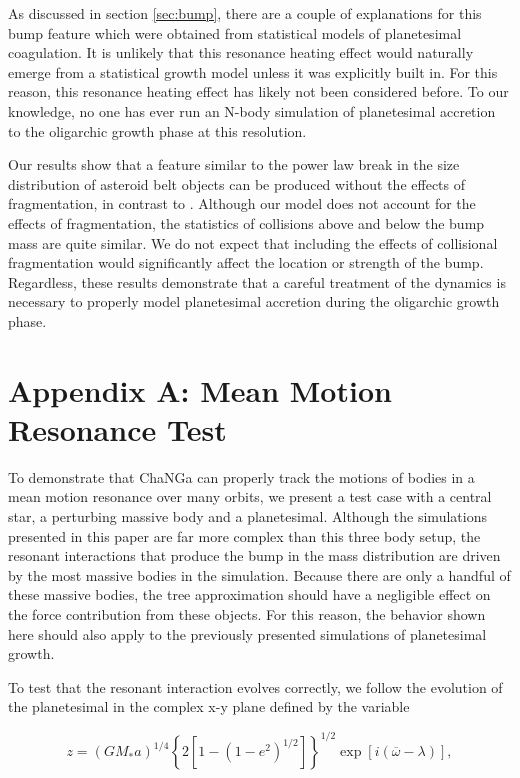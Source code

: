 As discussed in section \ref{sec:bump}, there are a couple of explanations for this bump feature which were obtained from 
statistical models of planetesimal coagulation. It is unlikely that this resonance heating effect would naturally emerge from a 
statistical growth model unless it was explicitly built in. For this reason, this resonance heating effect has likely not been 
considered before. To our knowledge, no one has ever run an N-body simulation of planetesimal accretion to the oligarchic 
growth phase at this resolution.

Our results show that a feature similar to the power law break in the size distribution of asteroid belt objects can be produced 
without the effects of fragmentation, in contrast to \cite{morbidelli09}. Although our model does not account for the effects of 
fragmentation, the statistics of collisions above and below the bump mass are quite similar. We do not expect that including the 
effects of collisional fragmentation would significantly affect the location or strength of the bump. Regardless, these results 
demonstrate that a careful treatment of the dynamics is necessary to properly model planetesimal accretion during the oligarchic 
growth phase.


\section{Appendix A: Mean Motion Resonance Test}

To demonstrate that {\sc ChaNGa} can properly track the motions of bodies in a mean motion resonance over many orbits, we 
present a test case with a central star, a perturbing massive body and a planetesimal. Although the simulations presented in this 
paper are far more complex than this three body setup, the resonant interactions that produce the bump in the mass distribution 
are driven by the most massive bodies in the simulation. Because there are only a handful of these massive bodies, the tree 
approximation should have a negligible effect on the force contribution from these objects. For this reason, the behavior shown 
here should also apply to the previously presented simulations of planetesimal growth.

To test that the resonant interaction evolves correctly, we follow the evolution of the planetesimal in the complex x-y plane 
defined by the variable \cite{duncan89}

\begin{equation}\label{eq:complex}
    z = \left(G M_{*} a\right)^{1 / 4}\left\{2\left[1-\left(1-e^{2}\right)^{1 / 2}\right]\right\}^{1 / 2} \exp \left[i(\overline{\omega}-\lambda)\right],
\end{equation}

